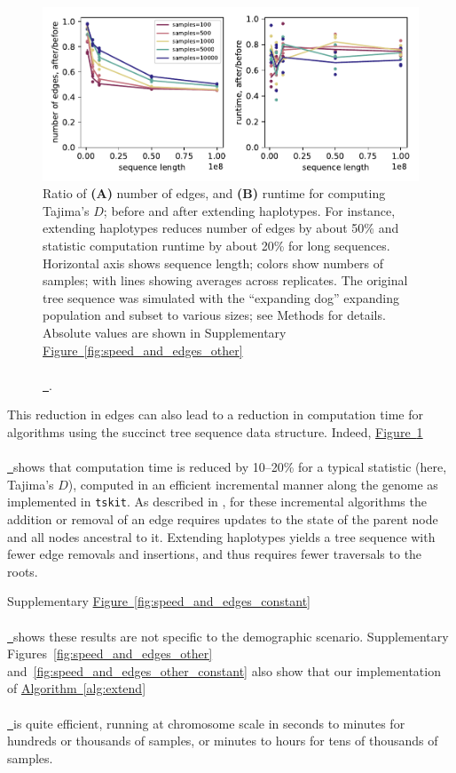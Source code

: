 \documentclass[10pt,twoside,lineno]{gsajnl}
\newcommand{\tskit}{\texttt{tskit}}
\newcommand{\algorithmref}[2][]{%
	\hyperref[{#2}]{%
		Algorithm~\ref*{#2}%
		\ifx\\#1\\%
		\else
		\,#1%
		\fi
	}%
}
\newcommand*{\figref}[2][]{%
	\hyperref[{#2}]{%
		Figure~\ref*{#2}%
		\ifx\\#1\\%
		\else
		\,#1%
		\fi
	}%
}
\begin{document}
\begin{figure}
    \centering
    \includegraphics{benchmarks/one_pop_results_ratios}
    \caption{
        Ratio of
        \textbf{(A)} number of edges, and
        \textbf{(B)} runtime for computing Tajima's $D$;
        before and after extending haplotypes.
        For instance, extending haplotypes reduces number of edges by about 50\%
        and statistic computation runtime by about 20\%
        for long sequences.
        Horizontal axis shows sequence length;
        colors show numbers of samples;
        with lines showing averages across replicates.
        The original tree sequence was simulated with the ``expanding dog'' expanding population
        and subset to various sizes;
        see Methods for details. 
        Absolute values are shown in Supplementary \figref{fig:speed_and_edges_other}.
        \label{fig:speed_and_edges}
    }
\end{figure}

This reduction in edges can also lead to a reduction in computation time for
algorithms using the succinct tree sequence data structure.
Indeed, \figref{fig:speed_and_edges} shows that computation time is reduced by 10--20\%
for a typical statistic (here, Tajima's $D$),
computed in an efficient incremental manner along the genome as implemented in \tskit.
As described in \citet{ralph2020efficiently}, for these incremental algorithms
the addition or removal of an edge requires updates
to the state of the parent node and all nodes ancestral to it.
Extending haplotypes yields a tree sequence with fewer edge removals and insertions, 
and thus requires fewer traversals to the roots.

Supplementary \figref{fig:speed_and_edges_constant} shows these results are not specific
to the demographic scenario.
Supplementary Figures~\ref{fig:speed_and_edges_other}
and~\ref{fig:speed_and_edges_other_constant}
also show that our implementation of \algorithmref{alg:extend} is quite efficient,
running at chromosome scale in seconds to minutes for hundreds or thousands of samples,
or minutes to hours for tens of thousands of samples.
\end{document}
